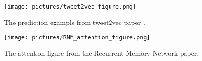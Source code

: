 \documentclass[11pt]{article}
\begin{document}
%   
%
%
%

\begin{figure}[htb]
  \begin{center}
     \scalebox{0.3}
      {\texttt{[image: pictures/tweet2vec\_figure.png]}}

      \caption{The prediction example from tweet2vec paper \cite{dhingra-EtAl:2016:P16-2}. }
      \label{fig:learning_rate}
     \end{center}
\vspace{-0.5cm}
\end{figure}



\begin{figure}[htb]
  \begin{center}
     \scalebox{0.3}
      {\texttt{[image: pictures/RNM\_attention\_figure.png]}}
   

      \caption{The attention figure from the Recurrent Memory Network paper. }
      \label{fig:learning_rate}
     \end{center}
\vspace{-0.5cm}
\end{figure}

%



\end{document}
